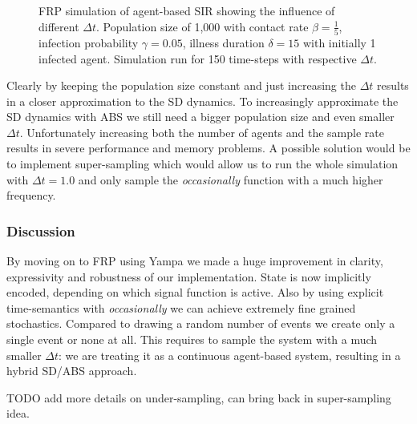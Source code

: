 \begin{figure}
\begin{center}
	\caption{FRP simulation of agent-based SIR showing the influence of different $\Delta t$. Population size of 1,000 with contact rate $\beta = \frac{1}{5}$, infection probability $\gamma = 0.05$, illness duration $\delta = 15$ with initially 1 infected agent. Simulation run for 150 time-steps with respective $\Delta t$.} 
	\label{fig:sir_abs_dynamics_frp}
\end{center}
\end{figure}

Clearly by keeping the population size constant and just increasing the $\Delta t$ results in a closer approximation to the SD dynamics. To increasingly approximate the SD dynamics with ABS we still need a bigger population size and even smaller $\Delta t$. Unfortunately increasing both the number of agents and the sample rate results in severe performance and memory problems. A possible solution would be to implement super-sampling which would allow us to run the whole simulation with $\Delta t = 1.0$ and only sample the \textit{occasionally} function with a much higher frequency. 

\subsubsection{Discussion}
By moving on to FRP using Yampa we made a huge improvement in clarity, expressivity and robustness of our implementation. State is now implicitly encoded, depending on which signal function is active. Also by using explicit time-semantics with \textit{occasionally} we can achieve extremely fine grained stochastics. Compared to drawing a random number of events we create only a single event or none at all. This requires to sample the system with a much smaller $\Delta t$: we are treating it as a continuous agent-based system, resulting in a hybrid SD/ABS approach.

TODO add more details on under-sampling, can bring back in super-sampling idea.

